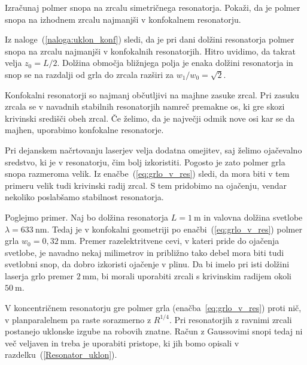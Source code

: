 \begin{definition}
\label{naloga:uklon_konf}
 Izračunaj polmer
 snopa na zrcalu simetričnega resonatorja. Pokaži, da je polmer snopa na 
 izhodnem zrcalu najmanjši v konfokalnem resonatorju. 
\end{definition} 

Iz naloge~(\ref{naloga:uklon_konf}) sledi, da je pri dani dolžini 
resonatorja polmer snopa na zrcalu najmanjši v konfokalnih 
resonatorjih.  Hitro uvidimo, da takrat 
velja $z_{0}=L/2$. Dolžina območja bližnjega polja je 
enaka dolžini resonatorja in snop se na razdalji od grla do zrcala razširi
za $w_1/w_0=\sqrt{2}$. 
\begin{remark}
Konfokalni resonatorji so najmanj občutljivi na majhne zasuke zrcal. 
Pri zasuku zrcala se v navadnih stabilnih resonatorjih namreč premakne os, ki gre skozi 
krivinski središči obeh zrcal. Če želimo, da je največji odmik nove osi kar se da
majhen, uporabimo konfokalne resonatorje. 
\end{remark}

Pri dejanskem načrtovanju laserjev velja dodatna omejitev, saj želimo 
ojačevalno sredstvo, ki je v resonatorju, čim bolj izkoristiti. Pogosto je zato 
polmer grla snopa razmeroma velik. Iz enačbe~(\ref{eq:grlo_v_res})
sledi, da mora biti v tem primeru velik tudi krivinski radij zrcal. S tem
pridobimo na ojačenju, vendar nekoliko poslabšamo stabilnost resonatorja.

Poglejmo primer. Naj bo dolžina resonatorja $L=1~\si{\metre}$ in valovna
dolžina svetlobe $\lambda = 633~\si{\nano\metre}$. Tedaj je v konfokalni geometriji po enačbi~(\ref{eq:grlo_v_res})
polmer grla $w_{0}=0,32~\si{\milli\metre}$. Premer razelektritvene cevi, v kateri pride
do ojačenja svetlobe, je navadno
nekaj milimetrov in približno tako debel mora biti tudi svetlobni
snop, da dobro izkoristi ojačenje v plinu.
Da bi imelo pri isti dolžini laserja grlo premer $2~\si{\milli\metre}$, bi morali
uporabiti zrcali s krivinskim radijem okoli $50~\si{\metre}$. 

V koncentričnem resonatorju gre polmer grla (enačba~\ref{eq:grlo_v_res}) proti nič, v
planparalelnem pa raste sorazmerno z $R^{1/4}$. Pri resonatorjih z ravnimi zrcali 
postanejo uklonske izgube na robovih znatne. Račun z Gaussovimi snopi tedaj ni več veljaven
in treba je uporabiti pristope, ki jih bomo opisali
v razdelku~(\ref{Resonator_uklon}).

